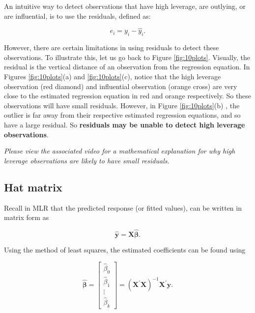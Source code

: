 \documentclass[
]{book}
\begin{document}
An intuitive way to detect observations that have high leverage, are outlying, or are influential, is to use the residuals, defined as:

\begin{equation} 
e_i = y_i - \hat{y_i}.
\label{eq:10res}
\end{equation}

However, there are certain limitations in using residuals to detect these observations. To illustrate this, let us go back to Figure \ref{fig:10plots}. Visually, the residual is the vertical distance of an observation from the regression equation. In Figures \ref{fig:10plots}(a) and \ref{fig:10plots}(c), notice that the high leverage observation (red diamond) and influential observation (orange cross) are very close to the estimated regression equation in red and orange respectively. So these observations will have small residuals. However, in Figure \ref{fig:10plots}(b) , the outlier is far away from their respective estimated regression equations, and so have a large residual. So \textbf{residuals may be unable to detect high leverage observations}.

\emph{Please view the associated video for a mathematical explanation for why high leverage observations are likely to have small residuals.}

\hypertarget{hat-matrix}{%
\subsection{Hat matrix}\label{hat-matrix}}

Recall in MLR that the predicted response (or fitted values), can be written in matrix form as

\begin{equation} 
\boldsymbol{\hat{y}} = \boldsymbol{X\hat{\beta}}.
\label{eq:10yhat}
\end{equation}

Using the method of least squares, the estimated coefficients can be found using

\begin{equation} 
\boldsymbol{\hat{\beta}} = \left[
\begin{array}{c}
   \hat{\beta}_0  \\
   \hat{\beta}_1 \\
   \vdots \\
   \hat{\beta}_k
\end{array}
\right]  =
\left(\boldsymbol{X}^{\prime} \boldsymbol{X} \right)^{-1} \boldsymbol{X}^{\prime} \boldsymbol{y} .
\label{eq:10b}
\end{equation}
\end{document}
